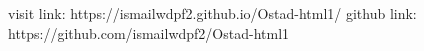 visit link: https://ismailwdpf2.github.io/Ostad-html1/
github link: https://github.com/ismailwdpf2/Ostad-html1
